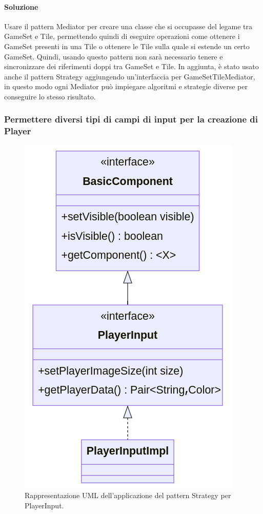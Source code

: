 \paragraph{Soluzione}
Usare il pattern Mediator per creare una classe che si occupasse del legame tra GameSet e Tile, permettendo quindi di eseguire operazioni come ottenere i GameSet presenti in una Tile o ottenere le Tile sulla quale si estende un certo GameSet. Quindi, usando questo pattern non sarà necessario tenere e sincronizzare dei riferimenti doppi tra GameSet e Tile. In aggiunta, è stato usato anche il pattern Strategy aggiungendo un'interfaccia per GameSetTileMediator, in questo modo ogni Mediator può impiegare algoritmi e strategie diverse per conseguire lo stesso risultato.
\clearpage

\subsubsection*{Permettere diversi tipi di campi di input per la creazione di Player}
\begin{figure}[ht]
    \centering\includegraphics[scale=.35]{images/playerinput.png}
    \caption{Rappresentazione UML dell'applicazione del pattern Strategy per PlayerInput.}
\end{figure}
